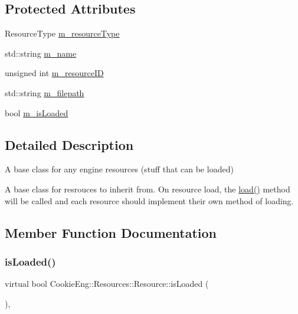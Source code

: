 \subsection*{Protected Attributes}
\begin{DoxyCompactItemize}
\item 
Resource\+Type \hyperlink{class_cookie_eng_1_1_resources_1_1_resource_a3740fe0571f4d65ddf71c36df0d8490c}{m\+\_\+resource\+Type}
\item 
std\+::string \hyperlink{class_cookie_eng_1_1_resources_1_1_resource_ae00a6a02ffb92b14dd72801c5df4d98f}{m\+\_\+name}
\item 
unsigned int \hyperlink{class_cookie_eng_1_1_resources_1_1_resource_a03ca114563713cc8e9965e71fa895da3}{m\+\_\+resource\+ID}
\item 
std\+::string \hyperlink{class_cookie_eng_1_1_resources_1_1_resource_aa7b58e5677b621033ac46b8577b8f48e}{m\+\_\+filepath}
\item 
bool \hyperlink{class_cookie_eng_1_1_resources_1_1_resource_a96c5a11b55f0e497ea0b38e2a1dbf175}{m\+\_\+is\+Loaded}
\end{DoxyCompactItemize}


\subsection{Detailed Description}
A base class for any engine resources (stuff that can be loaded) 

A base class for resrouces to inherit from. On resource load, the \hyperlink{class_cookie_eng_1_1_resources_1_1_resource_a75648b8f2e442bebc90d6eb4ea3a2f6e}{load()} method will be called and each resource should implement their own method of loading. 

\subsection{Member Function Documentation}
\mbox{\label{class_cookie_eng_1_1_resources_1_1_resource_a79d4a9f266373ca5b77d8debca83ee7f}} 
\subsubsection{\texorpdfstring{is\+Loaded()}{isLoaded()}}
{\footnotesize\ttfamily virtual bool Cookie\+Eng\+::\+Resources\+::\+Resource\+::is\+Loaded (\begin{DoxyParamCaption}{ }\end{DoxyParamCaption})\hspace{0.3cm}{\ttfamily [inline]}, {\ttfamily [virtual]}}



